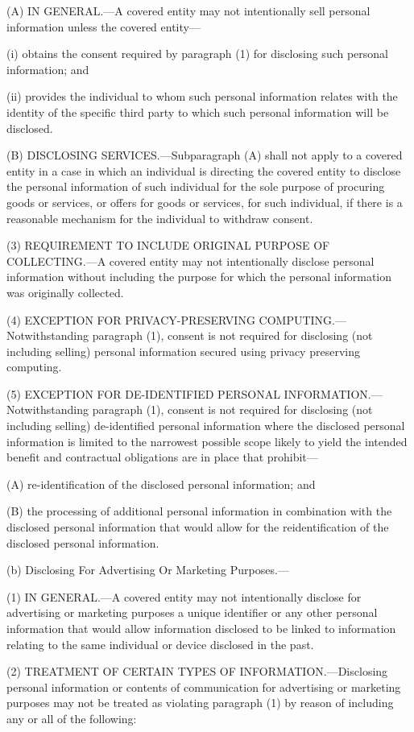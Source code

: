 (A) IN GENERAL.—A covered entity may not intentionally sell personal information unless the covered entity—

(i) obtains the consent required by paragraph (1) for disclosing such personal information; and

(ii) provides the individual to whom such personal information relates with the identity of the specific third party to which such personal information will be disclosed.

(B) DISCLOSING SERVICES.—Subparagraph (A) shall not apply to a covered entity in a case in which an individual is directing the covered entity to disclose the personal information of such individual for the sole purpose of procuring goods or services, or offers for goods or services, for such individual, if there is a reasonable mechanism for the individual to withdraw consent.

(3) REQUIREMENT TO INCLUDE ORIGINAL PURPOSE OF COLLECTING.—A covered entity may not intentionally disclose personal information without including the purpose for which the personal information was originally collected.

(4) EXCEPTION FOR PRIVACY-PRESERVING COMPUTING.—Notwithstanding paragraph (1), consent is not required for disclosing (not including selling) personal information secured using privacy preserving computing.

(5) EXCEPTION FOR DE-IDENTIFIED PERSONAL INFORMATION.—Notwithstanding paragraph (1), consent is not required for disclosing (not including selling) de-identified personal information where the disclosed personal information is limited to the narrowest possible scope likely to yield the intended benefit and contractual obligations are in place that prohibit—

(A) re-identification of the disclosed personal information; and

(B) the processing of additional personal information in combination with the disclosed personal information that would allow for the reidentification of the disclosed personal information.

(b) Disclosing For Advertising Or Marketing Purposes.—

(1) IN GENERAL.—A covered entity may not intentionally disclose for advertising or marketing purposes a unique identifier or any other personal information that would allow information disclosed to be linked to information relating to the same individual or device disclosed in the past.

(2) TREATMENT OF CERTAIN TYPES OF INFORMATION.—Disclosing personal information or contents of communication for advertising or marketing purposes may not be treated as violating paragraph (1) by reason of including any or all of the following:

